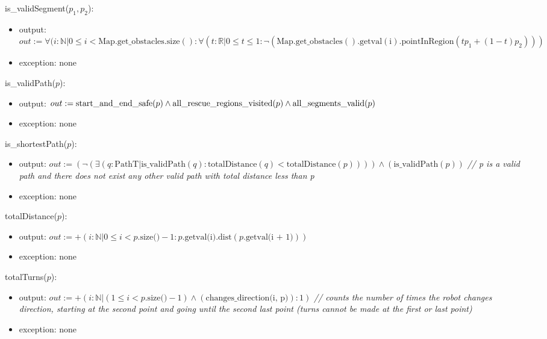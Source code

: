 \documentclass[12pt]{article}
\begin{document}
\noindent is\_validSegment($p_1, p_2$):
\begin{itemize}

\item output: $out := \forall (i : \mathbb{N} | 0 \leq i < \mathrm{Map.get\_obstacles.size()} : \forall (t : \mathbb{R} | 0 \leq t \leq 1 : \neg (\mathrm{Map.get\_obstacles().getval(i).pointInRegion}(tp_1 + (1 - t)p_2)))$
\item exception: none

\end{itemize}

\noindent is\_validPath($p$):
\begin{itemize}
\item output: $out := \mbox{start\_and\_end\_safe}(p) \wedge \mbox{all\_rescue\_regions\_visited}(p) \wedge \newline\mbox{all\_segments\_valid}(p) $
\item exception: none
\end{itemize}

\noindent is\_shortestPath($p$):
\begin{itemize}
\item output: $out := (\neg (\exists (q : \mbox{PathT} | \mbox{is\_validPath}(q) : \mbox{totalDistance}(q) < \mbox{totalDistance}(p)))) \wedge (\mbox{is\_validPath}(p)) $ {\it // p is a valid path and there does not exist any other valid path with total distance less than p}
\item exception: none
\end{itemize}

\noindent totalDistance($p$):
\begin{itemize}
\item output: $ out := +(i : \mathbb{N} | 0 \leq i < p.\mbox{size()} - 1 : p.\mbox{getval(i).dist}(p.\mbox{getval(i + 1)}) ) $
\item exception: none
\end{itemize}

\noindent totalTurns($p$):
\begin{itemize}
\item output: $ out :=  +(i : \mathbb{N} | (1 \leq i < p.\mbox{size()} - 1) \wedge (\mbox{changes\_direction(i, p)}) : 1) $ {\it // counts the number of times the robot changes direction, starting at the second point and going until the second last point (turns cannot be made at the first or last point)}
\item exception: none
\end{itemize}
\end{document}
